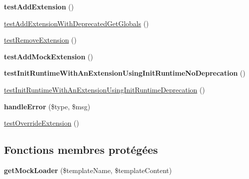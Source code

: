 \begin{DoxyCompactItemize}
\item 
{\bfseries test\+Add\+Extension} ()\hypertarget{class_twig___tests___environment_test_a3b7b1d86ef51625c55883e5975ad9216}{}\label{class_twig___tests___environment_test_a3b7b1d86ef51625c55883e5975ad9216}

\item 
\hyperlink{class_twig___tests___environment_test_a73211dfb2a2beaa28ab9e68710e7e6cc}{test\+Add\+Extension\+With\+Deprecated\+Get\+Globals} ()
\item 
\hyperlink{class_twig___tests___environment_test_a77d1b250637e7ac5f8271c1241c4292e}{test\+Remove\+Extension} ()
\item 
{\bfseries test\+Add\+Mock\+Extension} ()\hypertarget{class_twig___tests___environment_test_a2f459905f188db5553ef75465fec284e}{}\label{class_twig___tests___environment_test_a2f459905f188db5553ef75465fec284e}

\item 
{\bfseries test\+Init\+Runtime\+With\+An\+Extension\+Using\+Init\+Runtime\+No\+Deprecation} ()\hypertarget{class_twig___tests___environment_test_a8f5cc6bd92db8881d81763dfe59c6775}{}\label{class_twig___tests___environment_test_a8f5cc6bd92db8881d81763dfe59c6775}

\item 
\hyperlink{class_twig___tests___environment_test_a75a1a16c3355ecfb71cd7d84c0808468}{test\+Init\+Runtime\+With\+An\+Extension\+Using\+Init\+Runtime\+Deprecation} ()
\item 
{\bfseries handle\+Error} (\$type, \$msg)\hypertarget{class_twig___tests___environment_test_a02993eca58fd04f17e6410dc8a116bdd}{}\label{class_twig___tests___environment_test_a02993eca58fd04f17e6410dc8a116bdd}

\item 
\hyperlink{class_twig___tests___environment_test_ac732cb72c442679f1517a47e1f13cc45}{test\+Override\+Extension} ()
\end{DoxyCompactItemize}
\subsection*{Fonctions membres protégées}
\begin{DoxyCompactItemize}
\item 
{\bfseries get\+Mock\+Loader} (\$template\+Name, \$template\+Content)\hypertarget{class_twig___tests___environment_test_a82e4a19896d0a39d65aa2343eb503772}{}\label{class_twig___tests___environment_test_a82e4a19896d0a39d65aa2343eb503772}

\end{DoxyCompactItemize}


